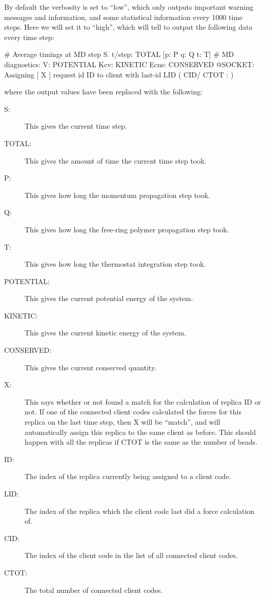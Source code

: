 \documentclass[11pt,english,fleqn]{report}
\newenvironment{code}{%
\footnotesize 
\verbatim
}{
\endverbatim
\normalsize
}
\begin{document}
By default the verbosity is set to {}``low'', which only outputs
important warning messages and information, and some statistical 
information every 1000 time steps. Here we will set it to 
{}``high'', which will 
tell \ipi to output the following data every time step:

\begin{code}
 # Average timings at MD step S. t/step: TOTAL [p: P q: Q t: T]
 # MD diagnostics: V: POTENTIAL Kcv: KINETIC Ecns: CONSERVED
 @SOCKET: Assigning [ X ] request id ID to client with last-id LID ( CID/ CTOT : )
\end{code}
where the output values have been replaced with the following:
\begin{description}
\item [{S:}] This gives the current time step.
\item[{TOTAL:}] This gives the amount of time the current time step took.
\item [{P:}] This gives how long the momentum propagation step took.
\item [{Q:}] This gives how long the free-ring polymer propagation step took.
\item [{T:}] This gives how long the thermostat integration step took.
\item [{POTENTIAL:}] This gives the current potential energy of the system.
\item [{KINETIC:}] This gives the current kinetic energy of the system.
\item [{CONSERVED:}] This gives the current conserved quantity.
\item [{X:}] This says whether or not \ipi found a match for the calculation of 
replica ID or not.
If one of the connected client codes calculated the forces for this replica on the
last time step, then X will be {}``match'', and \ipi will automatically assign
this replica to the same client as before. This should happen with all the replicas
if CTOT is the same as the number of beads.
\item [{ID:}] The index of the replica currently being assigned to a client code.
\item [{LID:}] The index of the replica which the client code last did a force calculation
of.
\item [{CID:}] The index of the client code in the list of all connected client codes.
\item [{CTOT:}] The total number of connected client codes.
\end{description}
\end{document}
